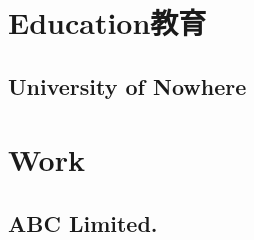 \documentclass{test}
\begin{document}
	
	
	\section{Education教育}
	\subsection{University of Nowhere}
	\section{Work}
	\subsection{ABC Limited.}
	
\end{document}
